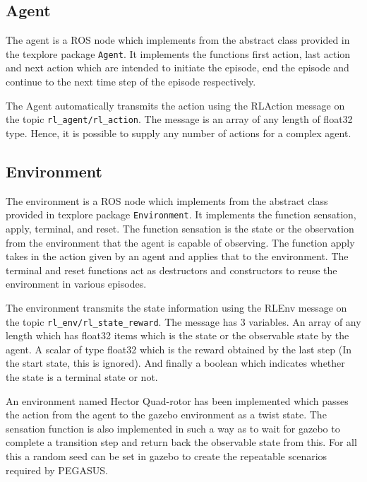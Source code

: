 \documentclass[BTech]{iitmdiss}
\begin{document}
\subsection*{Agent}

The agent is a ROS node which implements from the abstract class provided in the texplore package \texttt{Agent}. It implements the functions first action, last action and next action which are intended to initiate the episode, end the episode and continue to the next time step of the episode respectively.

The Agent automatically transmits the action using the RLAction message on the topic \texttt{rl\_agent/rl\_action}. The message is an array of any length of float32 type. Hence, it is possible to supply any number of actions for a complex agent.

\subsection*{Environment}

The environment is a ROS node which implements from the abstract class provided in texplore package \texttt{Environment}. It implements the function sensation, apply, terminal, and reset. The function sensation is the state or the observation from the environment that the agent is capable of observing. The function apply takes in the action given by an agent and applies that to the environment. The terminal and reset functions act as destructors and constructors to reuse the environment in various episodes.

The environment transmits the state information using the RLEnv message on the topic \texttt{rl\_env/rl\_state\_reward}. The message has 3 variables. An array of any length which has float32 items which is the state or the observable state by the agent. A scalar of type float32 which is the reward obtained by the last step (In the start state, this is ignored). And finally a boolean which indicates whether the state is a terminal state or not.

An environment named Hector Quad-rotor has been implemented which passes the action from the agent to the gazebo environment as a twist state. The sensation function is also implemented in such a way as to wait for gazebo to complete a transition step and return back the observable state from this. For all this a random seed can be set in gazebo to create the repeatable scenarios required by PEGASUS.

\end{document}
